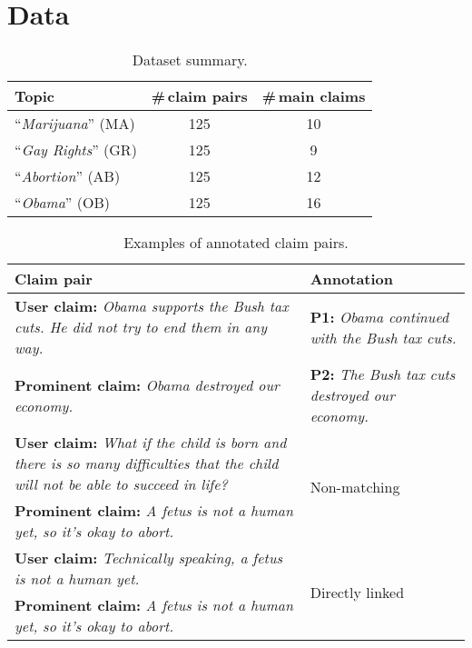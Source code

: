 \section{Data}
\label{sec:argpremise_dataset}

\begin{table}
\begin{center}
{\small
\begin{tabular}{lcc}
\toprule
Topic & \#\,claim pairs  & \#\,main claims \\
\midrule
``\emph{Marijuana}'' (MA)	   & 125                     &  10                    \\
``\emph{Gay Rights}'' (GR)	   & 125                     &  9                     \\
``\emph{Abortion}'' (AB)	   & 125                     &  12                    \\
``\emph{Obama}'' (OB)	       & 125                     &  16 \\
\bottomrule
\end{tabular}}
\caption{Dataset summary. }
\label{tab:argpremise_topic_distribution}
\end{center}
\end{table}


\begin{table}
{\small
\begin{tabular}{@{}p{}p{}@{}}
\toprule
Claim pair & Annotation            \\
\midrule
 \textbf{User claim:} \emph{Obama supports the Bush tax cuts. He did not try to
	end them in any way.} & \textbf{P1:}  \emph{Obama continued with the
	Bush tax cuts.}      \\
 \textbf{Prominent claim:} \emph{Obama destroyed our economy.}  & \textbf{P2:}
	\emph{The Bush tax cuts destroyed our economy.}   \\
\midrule
 \textbf{User claim:} \emph{What if the child is born and there is so many
	difficulties that the child will not be able to succeed in life?}  &
	\multirow{2}{*}{Non-matching}   \\
 \textbf{Prominent claim:} \emph{A fetus is not a human yet, so it's okay to abort.}
	&   \\
\midrule
 \textbf{User claim:} \emph{Technically speaking, a fetus is not a human yet.} & \multirow{2}{*}{Directly linked}      \\
 \textbf{Prominent claim:} \emph{A fetus is not a human yet, so it's okay to abort.}     & \\
\bottomrule
\end{tabular}}
\caption{Examples of annotated claim pairs.}
\label{tab:argpremises_example}
\end{table}

